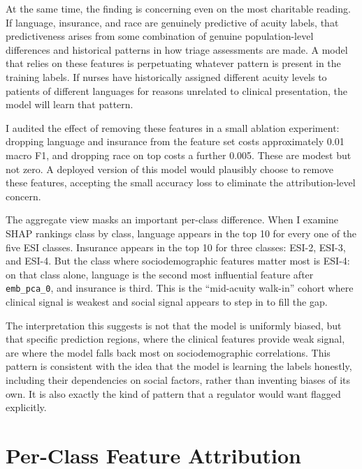At the same time, the finding is concerning even on the most charitable reading. If language, insurance, and race are genuinely predictive of acuity labels, that predictiveness arises from some combination of genuine population-level differences and historical patterns in how triage assessments are made. A model that relies on these features is perpetuating whatever pattern is present in the training labels. If nurses have historically assigned different acuity levels to patients of different languages for reasons unrelated to clinical presentation, the model will learn that pattern.

I audited the effect of removing these features in a small ablation experiment: dropping language and insurance from the feature set costs approximately 0.01 macro F1, and dropping race on top costs a further 0.005. These are modest but not zero. A deployed version of this model would plausibly choose to remove these features, accepting the small accuracy loss to eliminate the attribution-level concern.

\begin{notebox}
The aggregate view masks an important per-class difference. When I examine SHAP rankings class by class, language appears in the top 10 for every one of the five ESI classes. Insurance appears in the top 10 for three classes: ESI-2, ESI-3, and ESI-4. But the class where sociodemographic features matter most is ESI-4: on that class alone, language is the second most influential feature after \texttt{emb\_pca\_0}, and insurance is third. This is the ``mid-acuity walk-in'' cohort where clinical signal is weakest and social signal appears to step in to fill the gap.

The interpretation this suggests is not that the model is uniformly biased, but that specific prediction regions, where the clinical features provide weak signal, are where the model falls back most on sociodemographic correlations. This pattern is consistent with the idea that the model is learning the labels honestly, including their dependencies on social factors, rather than inventing biases of its own. It is also exactly the kind of pattern that a regulator would want flagged explicitly.
\end{notebox}

\section{Per-Class Feature Attribution}

